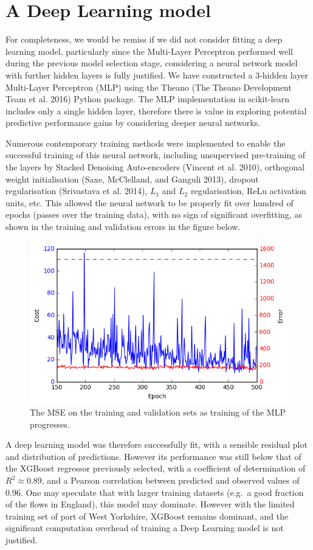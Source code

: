 \documentclass[]{article}
\begin{document}
\section{A Deep Learning model}\label{a-deep-learning-model}

For completeness, we would be remiss if we did not consider fitting a
deep learning model, particularly since the Multi-Layer Perceptron
performed well during the previous model selection stage, considering a
neural network model with further hidden layers is fully justified. We
have constructed a 3-hidden layer Multi-Layer Perceptron (MLP) using the
Theano (The Theano Development Team et al. 2016) Python package. The MLP
implementation in scikit-learn includes only a single hidden layer,
therefore there is value in exploring potential predictive performance
gains by considering deeper neural networks.

Numerous contemporary training methods were implemented to enable the
successful training of this neural network, including unsupervised
pre-training of the layers by Stacked Denoising Auto-encoders (Vincent
et al. 2010), orthogonal weight initialisation (Saxe, McClelland, and
Ganguli 2013), dropout regularisation (Srivastava et al. 2014), \(L_1\)
and \(L_2\) regularisation, ReLu activation units, etc. This allowed the
neural network to be properly fit over hundred of epochs (passes over
the training data), with no sign of significant overfitting, as shown in
the training and validation errors in the figure below.

\begin{figure}

{\centering \includegraphics[width=0.49\linewidth]{../figures/nn_training} 

}

\caption{The MSE on the training and validation sets as training of the MLP progresses.}\label{fig:unnamed-chunk-5}
\end{figure}

A deep learning model was therefore successfully fit, with a sensible
residual plot and distribution of predictions. However its performance
was still below that of the XGBoost regressor previously selected, with
a coefficient of determination of \(R^2 \approx 0.89\), and a Pearson
correlation between predicted and observed values of \(0.96\). One may
speculate that with larger training datasets (e.g.~a good fraction of
the flows in England), this model may dominate. However with the limited
training set of part of West Yorkshire, XGBoost remains dominant, and
the significant computation overhead of training a Deep Learning model
is not justified.
\end{document}
